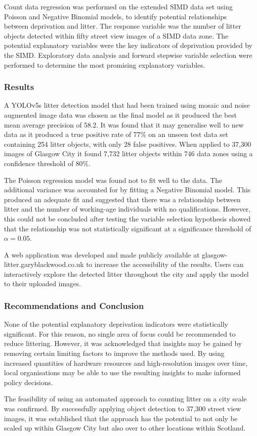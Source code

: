 \documentclass[10pt]{article}
\begin{document}
Count data regression was performed on the extended SIMD data set using Poisson and Negative Binomial models, to identify potential relationships between deprivation and litter. The response variable was the number of litter objects detected within fifty street view images of a SIMD data zone. The potential explanatory variables were the key indicators of deprivation provided by the SIMD. Exploratory data analysis and forward stepwise variable selection were performed to determine the most promising explanatory variables.

\subsubsection*{Results}

A YOLOv5s litter detection model that had been trained using mosaic and noise augmented image data was chosen as the final model as it produced the best mean average precision of 58.2. It was found that it may generalise well to new data as it produced a true positive rate of 77\% on an unseen test data set containing 254 litter objects, with only 28 false positives. When applied to 37,300 images of Glasgow City it found 7,732 litter objects within 746 data zones using a confidence threshold of 80\%.

The Poisson regression model was found not to fit well to the data. The additional variance was accounted for by fitting a Negative Binomial model. This produced an adequate fit and suggested that there was a relationship between litter and the number of working-age individuals with no qualifications. However, this could not be concluded after testing the variable selection hypothesis showed that the relationship was not statistically significant at a significance threshold of $\alpha = 0.05$.

A web application was developed and made publicly available at glasgow-litter.garyblackwood.co.uk to increase the accessibility of the results. Users can interactively explore the detected litter throughout the city and apply the model to their uploaded images.

\subsubsection*{Recommendations and Conclusion}

None of the potential explanatory deprivation indicators were statistically significant. For this reason, no single area of focus could be recommended to reduce littering. However, it was acknowledged that insights may be gained by removing certain limiting factors to improve the methods used. By using increased quantities of hardware resources and high-resolution images over time, local organisations may be able to use the resulting insights to make informed policy decisions.

The feasibility of using an automated approach to counting litter on a city scale was confirmed. By successfully applying object detection to 37,300 street view images, it was established that the approach has the potential to not only be scaled up within Glasgow City but also over to other locations within Scotland.
    
\end{document}
